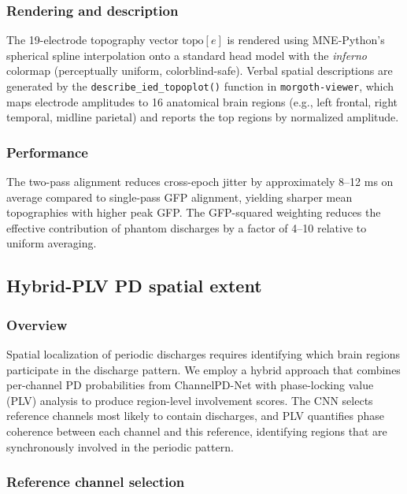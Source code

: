 \subsubsection{Rendering and description}

The 19-electrode topography vector $\mathrm{topo}[e]$ is rendered using MNE-Python's spherical spline interpolation onto a standard head model with the \emph{inferno} colormap (perceptually uniform, colorblind-safe). Verbal spatial descriptions are generated by the \texttt{describe\_ied\_topoplot()} function in \texttt{morgoth-viewer}, which maps electrode amplitudes to 16 anatomical brain regions (e.g., left frontal, right temporal, midline parietal) and reports the top regions by normalized amplitude.

\subsubsection{Performance}

The two-pass alignment reduces cross-epoch jitter by approximately 8--12 ms on average compared to single-pass GFP alignment, yielding sharper mean topographies with higher peak GFP. The GFP-squared weighting reduces the effective contribution of phantom discharges by a factor of 4--10 relative to uniform averaging.

\subsection{Hybrid-PLV PD spatial extent}
\label{app:hybrid_plv}

\subsubsection{Overview}

Spatial localization of periodic discharges requires identifying which brain regions participate in the discharge pattern. We employ a hybrid approach that combines per-channel PD probabilities from ChannelPD-Net with phase-locking value (PLV) analysis to produce region-level involvement scores. The CNN selects reference channels most likely to contain discharges, and PLV quantifies phase coherence between each channel and this reference, identifying regions that are synchronously involved in the periodic pattern.

\subsubsection{Reference channel selection}

